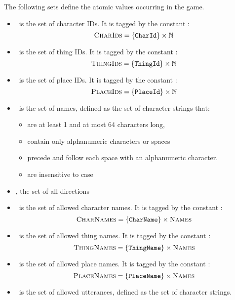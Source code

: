 The following sets define the atomic values occurring in the game.
\begin{itemize}
\item \charidset\ is the set of character IDs. It is tagged by the
  constant \charidtg:
  \[ \textsc{CharIds} = \{ \texttt{CharId} \} \times \mathbb{N} \]
\item \thingidset\ is the set of thing IDs. It is tagged by the
  constant \thingidtg:
  \[ \textsc{ThingIds} = \{ \texttt{ThingId} \} \times \mathbb{N} \]
\item \placeidset\ is the set of place IDs. It is tagged by the
  constant \placeidtg:
  \[ \textsc{PlaceIds} = \{ \texttt{PlaceId} \} \times \mathbb{N} \]
\item \nameset\ is the set of names, defined as the set of character
  strings that:
  \begin{itemize}
  \item are at least 1 and at most 64 characters long,
  \item contain only alphanumeric characters or spaces
  \item precede and follow each space with an alphanumeric character.
  \item are insensitive to case
  \end{itemize}
  \item \dirset, the set of all directions
\item \charnameset\ is the set of allowed character names. It is
  tagged by the constant \charnametg:
  \[ \textsc{CharNames} = \{ \texttt{CharName} \} \times \textsc{Names} \]
\item \thingnameset\ is the set of allowed thing names. It is tagged
  by the constant \thingnametg:
  \[ \textsc{ThingNames} = \{ \texttt{ThingName} \} \times \textsc{Names} \]
\item \placenameset\ is the set of allowed place names. It is tagged
  by the constant \placenametg:
  \[ \textsc{PlaceNames} = \{ \texttt{PlaceName} \} \times \textsc{Names} \]
\item \speechset\ is the set of allowed utterances, defined as the set
  of character strings.
\end{itemize}
